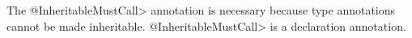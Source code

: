 The \<@InheritableMustCall> annotation is necessary because type
annotations cannot be made inheritable.  \<@InheritableMustCall> is
a declaration annotation.






